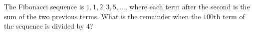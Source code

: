 The Fibonacci sequence is $1,1,2,3,5,\ldots$, where each term after the second is the sum of the two previous terms. What is the remainder when the $100$th term of the sequence is divided by $4$?
